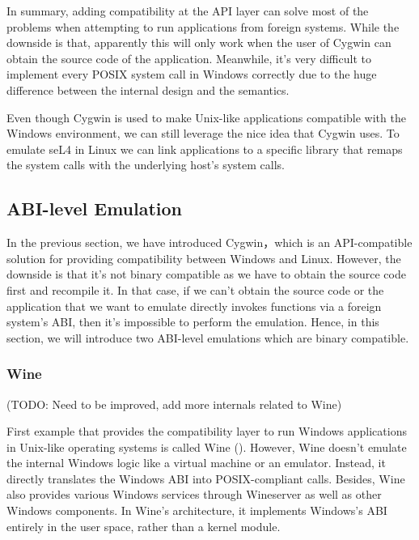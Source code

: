 In summary, adding compatibility at the API layer can solve most of the problems when attempting to run applications from foreign systems. While the downside is that, apparently this will only work when the user of Cygwin can obtain the source code of the application. Meanwhile, it's very difficult to implement every POSIX system call in Windows correctly due to the huge difference between the internal design and the semantics. 

Even though Cygwin is used to make Unix-like applications compatible with the Windows environment, we can still leverage the nice idea that Cygwin uses. To emulate seL4 in Linux we can link applications to a specific library that remaps the system calls with the underlying host's system calls.

\subsection{ABI-level Emulation}

In the previous section, we have introduced Cygwin，which is an API-compatible solution for providing compatibility between Windows and Linux. However, the downside is that it's not binary compatible as we have to obtain the source code first and recompile it. In that case,  if we can't obtain the source code or the application that we want to emulate directly invokes functions via a foreign system's ABI, then it's impossible to perform the emulation. Hence, in this section, we will introduce two ABI-level emulations which are binary compatible.

\subsubsection{Wine}

(TODO: Need to be improved, add more internals related to Wine)

First example that provides the compatibility layer to run Windows applications in Unix-like operating systems is called Wine (\cite{enwikiWine}). However, Wine doesn't emulate the internal Windows logic like a virtual machine or an emulator. Instead, it directly translates the Windows ABI into POSIX-compliant calls. Besides, Wine also provides various Windows services through Wineserver as well as other Windows components. In Wine's architecture, it implements Windows's ABI entirely in the user space, rather than a kernel module. 

